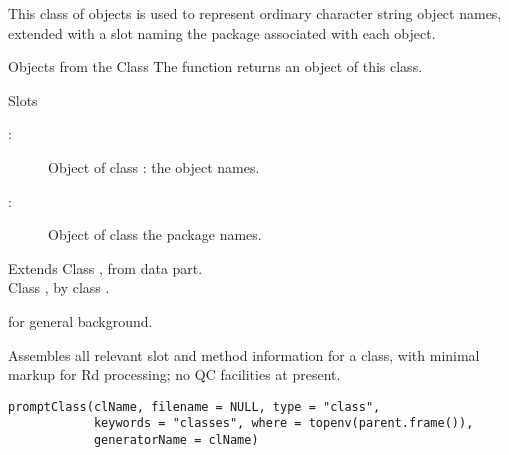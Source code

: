 %
\begin{Description}\relax
This class of objects is used to represent ordinary character string
object names, extended with a  slot naming the package
associated with each object.
\end{Description}
%
\begin{Section}{Objects from the Class}
The function  returns an object of this class.
\end{Section}
%
\begin{Section}{Slots}
\begin{description}

\item[:] Object of class : the
object names.
\item[:] Object of class  the
package names.

\end{description}

\end{Section}
%
\begin{Section}{Extends}
Class , from data part.\\{}
Class , by class .
\end{Section}
%
\begin{SeeAlso}\relax
  for general background. 
\end{SeeAlso}
%
\begin{Description}\relax
Assembles all relevant slot and method information for a class, with
minimal markup for Rd processing; no QC facilities at present.
\end{Description}
%
\begin{Usage}
\begin{verbatim}
promptClass(clName, filename = NULL, type = "class",
            keywords = "classes", where = topenv(parent.frame()),
            generatorName = clName)
\end{verbatim}
\end{Usage}
%
